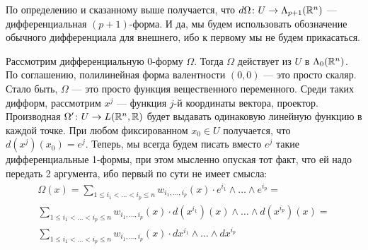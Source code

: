 \begin{note}
	По определению и сказанному выше получается, что $d\Omega \colon U \to \Lambda_{p + 1}(\mathbb{R}^n)$ --- дифференциальная $(p + 1)$-форма. И да, мы будем использовать обозначение обычного дифференциала для внешнего, ибо к первому мы не будем прикасаться.
\end{note}

\begin{note}
	Рассмотрим дифференциальную 0-форму $\Omega$. Тогда $\Omega$ действует из $U$ в $\Lambda_0(\mathbb{R}^n)$. По соглашению, полилинейная форма валентности $(0, 0)$ --- это просто скаляр. Стало быть, $\Omega$ --- это просто функция вещественного переменного. Среди таких дифформ, рассмотрим $x^j$ --- функция $j$-й координаты вектора, проектор. Производная $\Omega' \colon U \to L(\mathbb{R}^n, \mathbb{R})$ будет выдавать одинаковую линейную функцию в каждой точке. При любом фиксированном $x_0 \in U$ получается, что $d(x^j)(x_0) = e^j$. Теперь, мы всегда будем писать вместо $e^j$ такие дифференциальные 1-формы, при этом мысленно опуская тот факт, что ей надо передать 2 аргумента, ибо первый по сути не имеет смысла:
	\begin{multline*}
		\Omega(x) = \sum_{1 \le i_1 < \ldots < i_p \le n} w_{i_1, \ldots, i_p}(x) \cdot e^{i_1} \wedge \ldots \wedge e^{i_p} =
		\\
		\sum_{1 \le i_1 < \ldots < i_p \le n} w_{i_1, \ldots, i_p}(x) \cdot d(x^{i_1})(x) \wedge \ldots \wedge d(x^{i_p})(x) =
		\\
		\sum_{1 \le i_1 < \ldots < i_p \le n} w_{i_1, \ldots, i_p}(x) \cdot dx^{i_1} \wedge \ldots \wedge dx^{i_p}
	\end{multline*}
\end{note}

